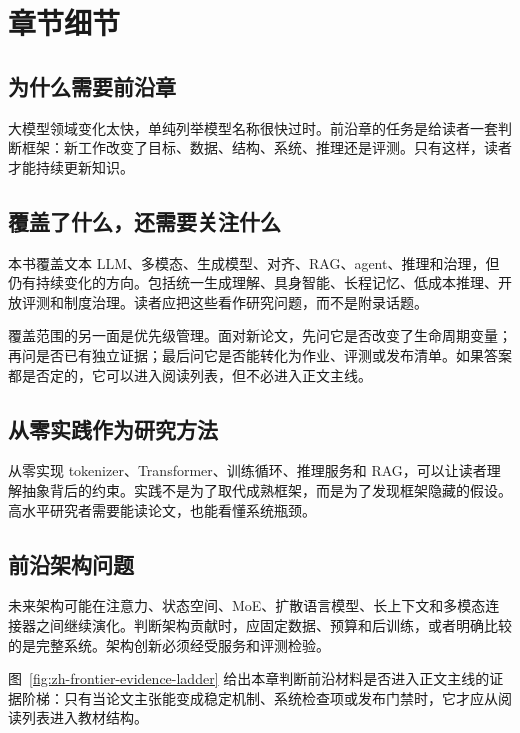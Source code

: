 \documentclass[UTF8,zihao=-4,openany]{ctexbook}
\begin{document}
\section{章节细节}
\subsection{为什么需要前沿章}
大模型领域变化太快，单纯列举模型名称很快过时。前沿章的任务是给读者一套判断框架：新工作改变了目标、数据、结构、系统、推理还是评测。只有这样，读者才能持续更新知识。

\subsection{覆盖了什么，还需要关注什么}
本书覆盖文本 LLM、多模态、生成模型、对齐、RAG、agent、推理和治理，但仍有持续变化的方向。包括统一生成理解、具身智能、长程记忆、低成本推理、开放评测和制度治理。读者应把这些看作研究问题，而不是附录话题。

覆盖范围的另一面是优先级管理。面对新论文，先问它是否改变了生命周期变量；再问是否已有独立证据；最后问它是否能转化为作业、评测或发布清单。如果答案都是否定的，它可以进入阅读列表，但不必进入正文主线。

\subsection{从零实践作为研究方法}
从零实现 tokenizer、Transformer、训练循环、推理服务和 RAG，可以让读者理解抽象背后的约束。实践不是为了取代成熟框架，而是为了发现框架隐藏的假设。高水平研究者需要能读论文，也能看懂系统瓶颈。

\subsection{前沿架构问题}
未来架构可能在注意力、状态空间、MoE、扩散语言模型、长上下文和多模态连接器之间继续演化。判断架构贡献时，应固定数据、预算和后训练，或者明确比较的是完整系统。架构创新必须经受服务和评测检验。

图~\ref{fig:zh-frontier-evidence-ladder} 给出本章判断前沿材料是否进入正文主线的证据阶梯：只有当论文主张能变成稳定机制、系统检查项或发布门禁时，它才应从阅读列表进入教材结构。
\end{document}
